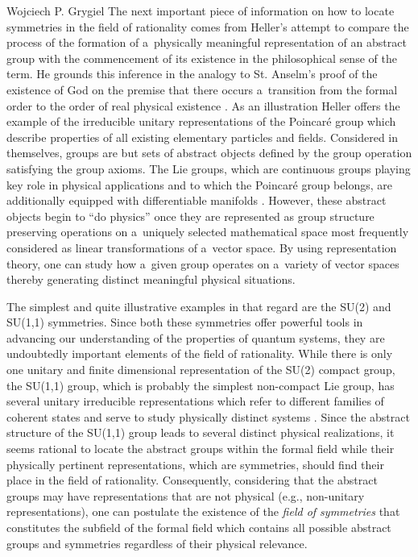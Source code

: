 \begin{artengenv}{Wojciech P. Grygiel}
The next important piece of information on how to locate symmetries in the field of rationality comes from Heller's attempt to compare the process of the formation of a~physically meaningful representation of an abstract group with the commencement of its existence in the philosophical sense of the term. He grounds this inference in the analogy to St. Anselm's proof of the existence of God on the premise that there occurs a~transition from the formal order to the order of real physical existence 
\parencite[][p.63]{heller_teilhards_2003}. %
 As an illustration Heller offers the example of the irreducible unitary representations of the Poincaré group which describe properties of all existing elementary particles and fields. Considered in themselves, groups are but sets of abstract objects defined by the group operation satisfying the group axioms. The Lie groups, which are continuous groups playing key role in physical applications and to which the Poincaré group belongs, are additionally equipped with differentiable manifolds 
\parencite[e.g][pp.47–54]{schwichtenberg_physics_2018}. %
 However, these abstract objects begin to ``do physics'' once they are represented as group structure preserving operations on a~uniquely selected mathematical space most frequently considered as linear transformations of a~vector space. By using representation theory, one can study how a~given group operates on a~variety of vector spaces thereby generating distinct meaningful physical situations.



The simplest and quite illustrative examples in that regard are the SU(2) and SU(1,1) symmetries. Since both these symmetries offer powerful tools in advancing our understanding of the properties of quantum systems, they are undoubtedly important elements of the field of rationality. While there is only one unitary and finite dimensional representation of the SU(2) compact group, the SU(1,1) group, which is probably the simplest non-compact Lie group, has several unitary irreducible representations which refer to different families of coherent states and serve to study physically distinct systems 
\parencite[e.g][]{vourdas_analytic_2006}. %
 Since the abstract structure of the SU(1,1) group leads to several distinct physical realizations, it seems rational to locate the abstract groups within the formal field while their physically pertinent representations, which are symmetries, should find their place in the field of rationality. Consequently, considering that the abstract groups may have representations that are not physical (e.g., non-unitary representations), one can postulate the existence of the \textit{field of symmetries} that constitutes the subfield of the formal field which contains all possible abstract groups and symmetries regardless of their physical relevance.




\end{artengenv}
